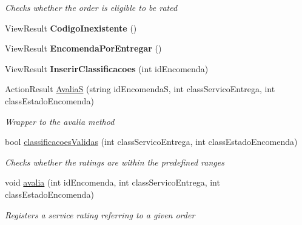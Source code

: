 \begin{DoxyCompactItemize}
\begin{DoxyCompactList}\small\item\em Checks whether the order is eligible to be rated \end{DoxyCompactList}\item 
\mbox{\label{classmvc_j_j_m_s_1_1_controllers_1_1_menu_cliente_controller_a9104ae784f8a690120c3fd46c2f28909}} 
View\+Result {\bfseries Codigo\+Inexistente} ()
\item 
\mbox{\label{classmvc_j_j_m_s_1_1_controllers_1_1_menu_cliente_controller_aaa920273d6cb8cd5dd28785c21c2d795}} 
View\+Result {\bfseries Encomenda\+Por\+Entregar} ()
\item 
\mbox{\label{classmvc_j_j_m_s_1_1_controllers_1_1_menu_cliente_controller_a0ccc43b32da53fb0cd59665b7023f266}} 
View\+Result {\bfseries Inserir\+Classificacoes} (int id\+Encomenda)
\item 
Action\+Result \mbox{\hyperlink{classmvc_j_j_m_s_1_1_controllers_1_1_menu_cliente_controller_a1e42ec4e15eda326d61aed409dab3a97}{AvaliaS}} (string id\+EncomendaS, int class\+Servico\+Entrega, int class\+Estado\+Encomenda)
\begin{DoxyCompactList}\small\item\em Wrapper to the avalia method \end{DoxyCompactList}\item 
bool \mbox{\hyperlink{classmvc_j_j_m_s_1_1_controllers_1_1_menu_cliente_controller_af0c08fdfd46b358fce2002e705daba6b}{classificacoes\+Validas}} (int class\+Servico\+Entrega, int class\+Estado\+Encomenda)
\begin{DoxyCompactList}\small\item\em Checks whether the ratings are within the predefined ranges \end{DoxyCompactList}\item 
void \mbox{\hyperlink{classmvc_j_j_m_s_1_1_controllers_1_1_menu_cliente_controller_a115e3395ec215fd48a75dc140232b7fe}{avalia}} (int id\+Encomenda, int class\+Servico\+Entrega, int class\+Estado\+Encomenda)
\begin{DoxyCompactList}\small\item\em Registers a service rating referring to a given order \end{DoxyCompactList}\item 

\end{DoxyCompactItemize}
